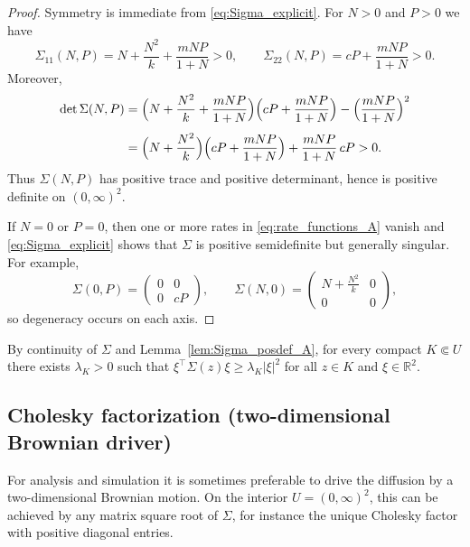\documentclass[pdflatex,sn-mathphys-ay]{sn-jnl}
\theoremstyle{thmstyleone}
\theoremstyle{definition}
\theoremstyle{remark}
\begin{document}
\begin{proof}
Symmetry is immediate from \eqref{eq:Sigma_explicit}. For $N>0$ and $P>0$ we have
\[
\Sigma_{11}(N,P)=N+\frac{N^2}{k}+\frac{mNP}{1+N}>0,
\qquad
\Sigma_{22}(N,P)=cP+\frac{mNP}{1+N}>0.
\]
Moreover,
\begin{align*}
\det \Sigma(N,P)
&=
\Bigl(N+\frac{N^2}{k}+\frac{mNP}{1+N}\Bigr)\Bigl(cP+\frac{mNP}{1+N}\Bigr)
-\Bigl(\frac{mNP}{1+N}\Bigr)^2\\[4pt]
&=
\Bigl(N+\frac{N^2}{k}\Bigr)\Bigl(cP+\frac{mNP}{1+N}\Bigr)
+\frac{mNP}{1+N}\,cP
>0.
\end{align*}
Thus $\Sigma(N,P)$ has positive trace and positive determinant, hence is positive definite on $(0,\infty)^2$.

If $N=0$ or $P=0$, then one or more rates in \eqref{eq:rate_functions_A} vanish and \eqref{eq:Sigma_explicit} shows
that $\Sigma$ is positive semidefinite but generally singular. For example,
\[
\Sigma(0,P)=\begin{pmatrix}0&0\\0&cP\end{pmatrix},
\qquad
\Sigma(N,0)=\begin{pmatrix}N+\frac{N^2}{k}&0\\0&0\end{pmatrix},
\]
so degeneracy occurs on each axis.
\end{proof}

By continuity of $\Sigma$ and Lemma~\ref{lem:Sigma_posdef_A}, for every compact $K\Subset U$ there exists
$\lambda_K>0$ such that $\xi^\top\Sigma(z)\xi\ge\lambda_K|\xi|^2$ for all $z\in K$ and $\xi\in\mathbb{R}^2$.

\subsection*{Cholesky factorization (two-dimensional Brownian driver)}
\label{subsec:cholesky_factorization_A}

For analysis and simulation it is sometimes preferable to drive the diffusion by a two-dimensional Brownian motion.
On the interior $U=(0,\infty)^2$, this can be achieved by any matrix square root of $\Sigma$, for instance the unique
Cholesky factor with positive diagonal entries.
\end{document}
